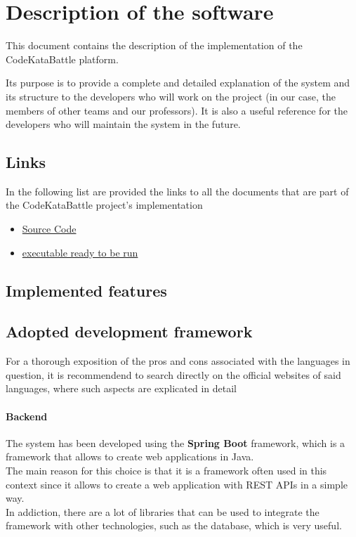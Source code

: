 \chapter{Description of the software}

This document contains the description of the implementation of the CodeKataBattle platform.

Its purpose is to provide a complete and detailed explanation of the system and its structure to the developers who will work on the project (in our case, the members of other teams and our professors). It is also a useful reference for the developers who will maintain the system in the future.

\section{Links}
In the following list are provided the links to all the documents that are part of the CodeKataBattle project's implementation

\begin{itemize}
    \item \href{https://github.com/pontig/sw-eng-2-PasiniPontiggiaStasi/tree/main/ITD/CodeKataBattle}{Source Code}
    \item \href{https://github.com/pontig/sw-eng-2-PasiniPontiggiaStasi/tree/main/ITD/CodeKataBattle/out/artifacts/CodeKataBattle_jar}{executable ready to be run}
\end{itemize}

\section{Implemented features}



\section{Adopted development framework}

For a thorough exposition of the pros and cons associated with the languages in question, it is recommendend to search directly on the official websites of said languages, where such aspects are explicated in detail

\subsubsection{Backend}
The system has been developed using the \textbf{Spring Boot} framework, which is a framework that allows to create web applications in Java.\\
The main reason for this choice is that it is a framework often used in this context since it allows to create a web application with REST APIs in a simple way.\\In addiction, there are a lot of libraries that can be used to integrate the framework with other technologies, such as the database, which is very useful.\\

